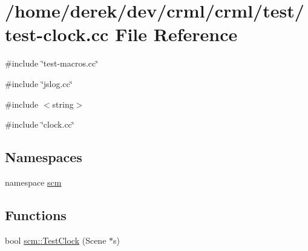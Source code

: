 \hypertarget{test-clock_8cc}{
\section{/home/derek/dev/crml/crml/test/test-\/clock.cc File Reference}
\label{test-clock_8cc}
}
{\ttfamily \#include \char`\"{}test-\/macros.cc\char`\"{}}\par
{\ttfamily \#include \char`\"{}jslog.cc\char`\"{}}\par
{\ttfamily \#include $<$string$>$}\par
{\ttfamily \#include \char`\"{}clock.cc\char`\"{}}\par
\subsection*{Namespaces}
\begin{DoxyCompactItemize}
\item 
namespace \hyperlink{namespacescm}{scm}
\end{DoxyCompactItemize}
\subsection*{Functions}
\begin{DoxyCompactItemize}
\item 
bool \hyperlink{namespacescm_a2f933647227de09b34772f194e579a63}{scm::TestClock} (Scene $\ast$s)
\end{DoxyCompactItemize}
